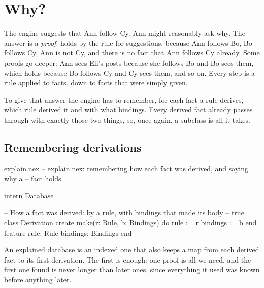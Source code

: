 \chapter{Why?}\label{ch:explanations}

The engine suggests that Ann follow Cy. Ann might reasonably ask why. The
answer is a \emph{proof}:  holds by the rule for
suggestions, because Ann follows Bo, Bo follows Cy, Ann is not Cy, and there
is no fact that Ann follows Cy already. Some proofs go deeper: Ann sees
Eli's posts because she follows Bo and Bo sees them, which holds because Bo
follows Cy and Cy sees them, and so on. Every step is a rule applied to
facts, down to facts that were simply given.

To give that answer the engine has to remember, for each fact a rule
derives, which rule derived it and with what bindings. Every derived fact
already passes through  with exactly those two things, so,
once again, a subclass is all it takes.

\section{Remembering derivations}

\begin{newfile}{explain.nex}
-- explain.nex: remembering how each fact was derived, and saying why a
-- fact holds.

intern Database

-- How a fact was derived: by a rule, with bindings that made its body
-- true.
class Derivation
create
  make(r: Rule, b: Bindings)
  do
    rule := r
    bindings := b
  end
feature
  rule: Rule
  bindings: Bindings
end
\end{newfile}

An explained database is an indexed one that also keeps a map from each
derived fact to its first derivation. The first is enough: one proof is all
we need, and the first one found is never longer than later ones, since
everything it used was known before anything later.

